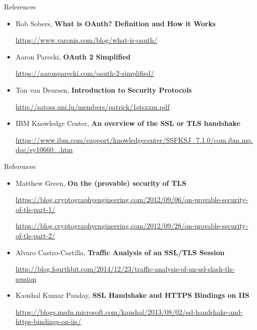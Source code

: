 \documentclass[pdf]{beamer}
\begin{document}
\begin{frame}{References}
\begin{itemize}
\item
Rob Sobers, \textbf{What is OAuth? Definition and How it Works}

\url{https://www.varonis.com/blog/what-is-oauth/}

\item
Aaron Parecki, \textbf{OAuth 2 Simplified}

\url{https://aaronparecki.com/oauth-2-simplified/}

\item
Ton van Deursen, \textbf{Introduction to Security Protocols}

\url{http://satoss.uni.lu/members/patrick/1stsxxm.pdf}

\item
IBM Knowledge Center, \textbf{An overview of the SSL or TLS handshake}

\url{https://www.ibm.com/support/knowledgecenter/SSFKSJ_7.1.0/com.ibm.mq.doc/sy10660_.htm}

\end{itemize}
\end{frame}



\begin{frame}{References}
\begin{itemize}
\item
Matthew Green, \textbf{On the (provable) security of TLS}

\url{https://blog.cryptographyengineering.com/2012/09/06/on-provable-security-of-tls-part-1/}

\url{https://blog.cryptographyengineering.com/2012/09/28/on-provable-security-of-tls-part-2/}

\item
Alvaro Castro-Castilla, \textbf{Traffic Analysis of an SSL/TLS Session} 

\url{http://blog.fourthbit.com/2014/12/23/traffic-analysis-of-an-ssl-slash-tls-session}

\item
Kaushal Kumar Panday, \textbf{SSL Handshake and HTTPS Bindings on IIS}

\url{https://blogs.msdn.microsoft.com/kaushal/2013/08/02/ssl-handshake-and-https-bindings-on-iis/}
\end{itemize}
\end{frame}
\end{document}

